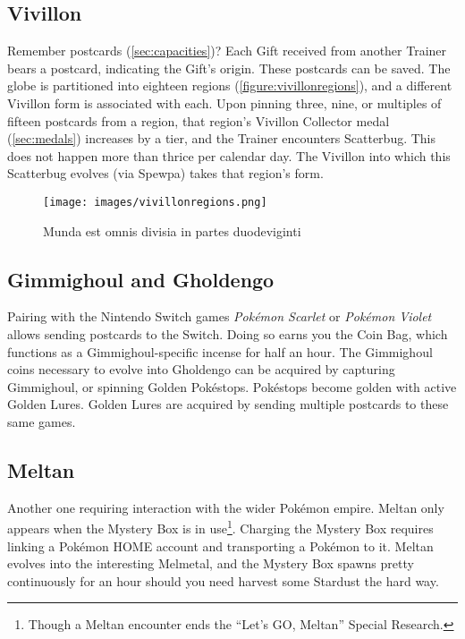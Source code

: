 \subsection{Vivillon\label{subsec:vivillon}}
Remember postcards (\autoref{sec:capacities})?
Each Gift received from another Trainer bears a postcard, indicating the Gift's origin.
These postcards can be saved.
The globe is partitioned into eighteen regions (\autoref{figure:vivillonregions}),
  and a different Vivillon form is associated with each.
Upon pinning three, nine, or multiples of fifteen postcards from a region,
  that region's Vivillon Collector medal (\autoref{sec:medals}) increases
  by a tier, and the Trainer encounters Scatterbug.
This does not happen more than thrice per calendar day.
The Vivillon into which this Scatterbug evolves (via Spewpa) takes that region's form.
\begin{figure}
\centering
\texttt{[image: images/vivillonregions.png]}
\caption{Munda est omnis divisia in partes duodeviginti\label{figure:vivillonregions}}
\end{figure}

\subsection{Gimmighoul and Gholdengo\label{subsec:gimmighoul}}
Pairing with the Nintendo Switch games \textit{Pokémon Scarlet} or \textit{Pokémon Violet}
 allows sending postcards to the Switch.
Doing so earns you the Coin Bag, which functions as a Gimmighoul-specific incense for half an hour.
The Gimmighoul coins necessary to evolve into Gholdengo can be acquired by capturing
 Gimmighoul, or spinning Golden Pokéstops.
Pokéstops become golden with active Golden Lures.
Golden Lures are acquired by sending multiple postcards to these same games.

\subsection{Meltan\label{subsec:meltan}}
Another one requiring interaction with the wider Pokémon empire.
Meltan only appears when the Mystery Box is in use\footnote{Though a Meltan encounter ends the ``Let's GO, Meltan'' Special Research.}.
Charging the Mystery Box requires linking a Pokémon HOME account and transporting
  a Pokémon to it.
Meltan evolves into the interesting Melmetal, and the Mystery
  Box spawns pretty continuously for an hour should you need harvest some Stardust
  the hard way.

